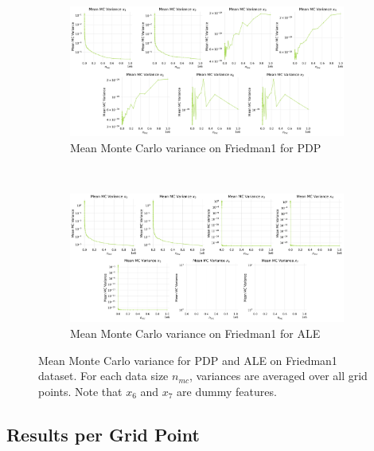 \documentclass[runningheads]{llncs}
\begin{document}
\begin{figure}[h!]
    \centering
    \begin{subfigure}[b]{\textwidth}
        \centering
        \includegraphics[width=\textwidth]{img/Friedman1-all/mean_mc_variance_pdp.png}
        \caption{Mean Monte Carlo variance on Friedman1 for PDP}
    \end{subfigure}
    \\[10pt]
    \vfill
    \begin{subfigure}[b]{\textwidth}
        \centering
        \includegraphics[width=\textwidth]{img/Friedman1-all/mean_mc_variance_ale.png}
        \caption{Mean Monte Carlo variance on Friedman1 for ALE}
    \end{subfigure}
    \caption{Mean Monte Carlo variance for PDP and ALE on Friedman1 dataset.
    For each data size $n_{mc}$, variances are averaged over all grid points.
    Note that $x_6$ and $x_7$ are dummy features.}
    \label{fig:mean-mc-variance-friedman1}  %
\end{figure}

\clearpage
\subsection{Results per Grid Point}
\end{document}
